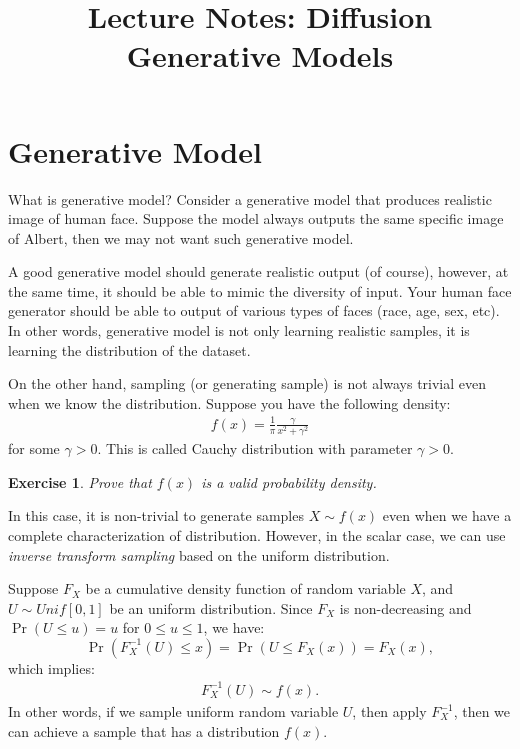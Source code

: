 \documentclass[11pt, a4paper]{article}
\newtheorem{exercise}{Exercise}
\begin{document}
\title{Lecture Notes: Diffusion Generative Models}
\author{}
\date{}
\maketitle



\section{Generative Model} \label{sec:diffusion-generative}
What is generative model?
Consider a generative model that produces realistic image of human face.
Suppose the model always outputs the same specific image of Albert, 
then we may not want such generative model.

A good generative model should generate realistic output (of course),
however, at the same time, it should be able to mimic the diversity of input.
Your human face generator should be able to output of various types of faces (race, age, sex, etc).
In other words, generative model is not only learning realistic samples, 
it is learning the distribution of the dataset.

On the other hand, sampling (or generating sample) is not always trivial even when we know the distribution.
Suppose you have the following density:
\begin{align}
    f(x) = \frac{1}{\pi} \frac{\gamma}{x^2+\gamma^2}
\end{align}
for some $\gamma>0$.
This is called Cauchy distribution with parameter $\gamma>0$.

\begin{exercise}
    Prove that $f(x)$ is a valid probability density.
\end{exercise}

In this case, it is non-trivial to generate samples $X\sim f(x)$ even when we have a complete characterization of distribution.
However, in the scalar case, we can use \emph{inverse transform sampling} based on the uniform distribution.

Suppose $F_X$ be a cumulative density function of random variable $X$, and $U\sim Unif[0, 1]$ be an uniform distribution.
Since \(F_X\) is non-decreasing and \(\Pr(U\leq u)=u\) for \(0\leq u \leq 1\), we have:
\begin{equation*}
    \Pr(F_X^{-1}(U)\leq x) = \Pr(U\leq F_X(x)) = F_X(x),
\end{equation*}
which implies:
\begin{align*}
    F_X^{-1}(U) \sim f(x).
\end{align*}
In other words, if we sample uniform random variable $U$, then apply $F^{-1}_X$, then we can achieve a sample that has a distribution $f(x)$.
\end{document}
